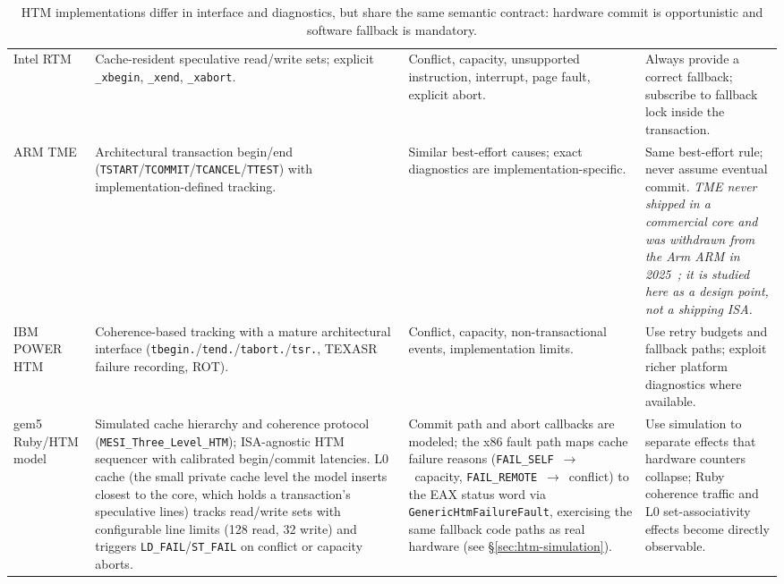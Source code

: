 \begin{table}[htbp]
\centering
\begin{tabular}{M{0.18\textwidth}M{0.25\textwidth}M{0.25\textwidth}M{0.22\textwidth}}
\hline
{} &  &  &  \\
\hline
Intel RTM & Cache-resident speculative read/write sets; explicit \texttt{\_xbegin}, \texttt{\_xend}, \texttt{\_xabort}. & Conflict, capacity, unsupported instruction, interrupt, page fault, explicit abort. & Always provide a correct fallback; subscribe to fallback lock inside the transaction.\\
ARM TME & Architectural transaction begin/end (\texttt{TSTART}/\allowbreak\texttt{TCOMMIT}/\allowbreak\texttt{TCANCEL}/\allowbreak\texttt{TTEST}) with implementation-defined tracking. & Similar best-effort causes; exact diagnostics are implementation-specific. & Same best-effort rule; never assume eventual commit. \emph{TME never shipped in a commercial core and was withdrawn from the Arm ARM in 2025~\cite{arm25tmew}; it is studied here as a design point, not a shipping ISA.}\\
IBM POWER HTM & Coherence-based tracking with a mature architectural interface (\texttt{tbegin.}/\allowbreak\texttt{tend.}/\allowbreak\texttt{tabort.}/\allowbreak\texttt{tsr.}, TEXASR failure recording, ROT). & Conflict, capacity, non-transactional events, implementation limits. & Use retry budgets and fallback paths; exploit richer platform diagnostics where available.\\
gem5 Ruby/HTM model & Simulated cache hierarchy and coherence protocol (\texttt{MESI\_Three\_\allowbreak Level\_HTM}); ISA-agnostic HTM sequencer with calibrated begin/commit latencies. L0 cache (the small private cache level the model inserts closest to the core, which holds a transaction's speculative lines) tracks read/write sets with configurable line limits (128 read, 32 write) and triggers \texttt{LD\_FAIL}/\texttt{ST\_FAIL} on conflict or capacity aborts. & Commit path and abort callbacks are modeled; the x86 fault path maps cache failure reasons (\texttt{FAIL\_SELF}~$\to$~capacity, \texttt{FAIL\_REMOTE}~$\to$~conflict) to the EAX status word via \texttt{GenericHtmFailureFault}, exercising the same fallback code paths as real hardware (see \S\ref{sec:htm-simulation}). & Use simulation to separate effects that hardware counters collapse; Ruby coherence traffic and L0 set-associativity effects become directly observable.\\
\hline
\end{tabular}
\caption{HTM implementations differ in interface and diagnostics, but share the same semantic contract: hardware commit is opportunistic and software fallback is mandatory.}
\label{tab:htm-implementations}
\end{table}

